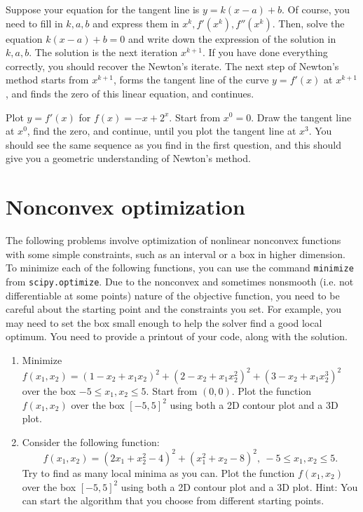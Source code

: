 \documentclass{article}
\begin{document}
\begin{enumerate}
    Suppose your equation for the tangent line is $y=k(x-a)+b$. Of course, you need to fill in $k,a,b$ and express them in $x^k, f'(x^k), f''(x^k)$. Then, solve the equation $k(x-a)+b=0$ and write down the expression of the solution in $k,a,b$. The solution is the next iteration $x^{k+1}$. If you have done everything correctly, you should recover the Newton's iterate. The next step of Newton's method starts from $x^{k+1}$, forms the tangent line of the curve $y=f'(x)$ at $x^{k+1}$, and finds the zero of this linear equation, and continues.
    
    Plot $y=f'(x)$ for $f(x)=-x + 2^x$. Start from $x^0=0$. Draw the tangent line at $x^0$, find the zero, and continue, until you plot the tangent line at $x^3$. You should see the same sequence as you find in the first question, and this should give you a geometric understanding of Newton's method.
    
    
\end{enumerate}

\section{Nonconvex optimization}
The following problems involve optimization of nonlinear nonconvex functions with some simple constraints, such as an interval or a box in higher dimension. 
To minimize each of the following functions, you can use the command {\tt minimize} from {\tt scipy.optimize}. Due to the nonconvex and sometimes nonsmooth (i.e. not differentiable at some points) nature of the objective function, you need to be careful about the starting point and the constraints you set. For example, you may need to set the box small enough to help the solver find a good local optimum. You need to provide a printout of your code, along with the solution. 

\begin{enumerate}


\item Minimize $f(x_1, x_2)=(1-x_2+x_1x_2)^2+(2-x_2+x_1x_2^2)^2+(3-x_2+x_1x_2^3)^2$ over the box $-5\le x_1, x_2 \le 5$. Start from $(0,0)$. Plot the function $f(x_1,x_2)$ over the box $[-5,5]^2$ using both a 2D contour plot and a 3D plot.



\item Consider the following function:
$$f(x_1,x_2) = (2x_1 + x_2^2 - 4)^2 + (x_1^2 + x_2 - 8)^2,\ -5\le x_1,x_2 \le 5.$$ 
Try to find as many local minima as you can. Plot the function $f(x_1,x_2)$ over the box $[-5,5]^2$ using both a 2D contour plot and a 3D plot. Hint: You can start the algorithm that you choose from different starting points.


\end{enumerate}
\end{document}
